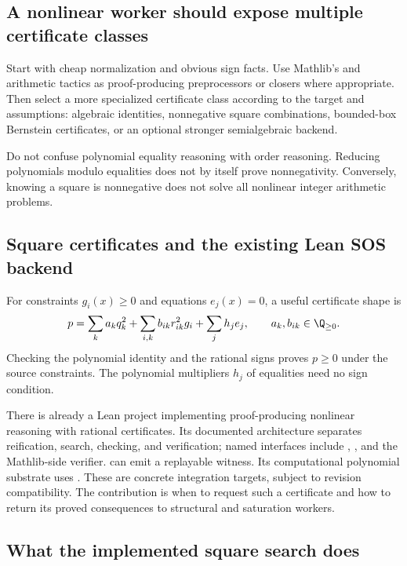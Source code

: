 \subsection{A nonlinear worker should expose multiple certificate classes}

Start with cheap normalization and obvious sign facts. Use Mathlib's
 and arithmetic tactics as proof-producing preprocessors or
closers where appropriate.\cite{positivity,linarith} Then select a more
specialized certificate class according to the target and assumptions:
algebraic identities, nonnegative square combinations, bounded-box Bernstein
certificates, or an optional stronger semialgebraic backend.

Do not confuse polynomial equality reasoning with order reasoning. Reducing
polynomials modulo equalities does not by itself prove nonnegativity.
Conversely, knowing a square is nonnegative does not solve all nonlinear
integer arithmetic problems.

\subsection{Square certificates and the existing Lean SOS backend}

For constraints $g_i(x)\ge0$ and equations $e_j(x)=0$, a useful certificate
shape is
\begin{equation}\label{eq:sos}
p=\sum_k a_kq_k^2
   +\sum_{i,k} b_{ik}r_{ik}^2g_i
   +\sum_j h_je_j,
\qquad a_k,b_{ik}\in\Q_{\ge0}.
\end{equation}
Checking the polynomial identity and the rational signs proves $p\ge0$ under
the source constraints. The polynomial multipliers $h_j$ of equalities need
no sign condition.

There is already a Lean  project implementing proof-producing
nonlinear reasoning with rational certificates. Its documented architecture
separates reification, search, checking, and verification; named interfaces
include , , and the
Mathlib-side verifier.  can emit a replayable witness. Its
computational polynomial substrate uses .\cite{sos}
These are concrete integration targets, subject to revision compatibility.
The \Forge{} contribution is when to request such a certificate and how to
return its proved consequences to structural and saturation workers.

\subsection{What the implemented square search does}

